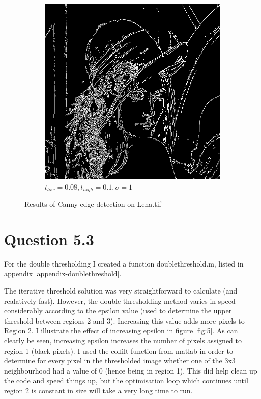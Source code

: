 \documentclass[a4paper]{article}
\begin{document}
\begin{figure}[h]
\begin{subfigure}[b]{0.3\textwidth}
        \end{subfigure}
        \begin{subfigure}[b]{0.3\textwidth}
                \centering
                \includegraphics[width=\textwidth]{q2-lena-canny-010081.png}
                \caption{$t_{low}=0.08, t_{high}=0.1, \sigma=1$}
                \label{fig:3c}
                
        \end{subfigure}
        
        \caption{Results of Canny edge detection on Lena.tif}        
        \label{fig:3}
\end{figure}

\clearpage
\section*{Question 5.3}
For the double thresholding I created a function doublethreshold.m, listed in appendix \ref{appendix-doublethreshold}.

The iterative threshold solution was very straightforward to calculate (and realatively fast). However, the double thresholding method varies in speed considerably according to the epsilon value (used to determine the upper threshold between regions 2 and 3). Increasing this value adds more pixels to Region 2. I illustrate the effect of increasing epsilon in figure \ref{fig:5}. As can clearly be seen, increasing epsilon increases the number of pixels assigned to region 1 (black pixels).
I used the colfilt function from matlab in order to determine for every pixel in the thresholded image whether one of the 3x3 neighbourhood had a value of 0 (hence being in region 1). This did help clean up the code and speed things up, but the optimisation loop which continues until region 2 is constant in size will take a very long time to run.
\end{document}
